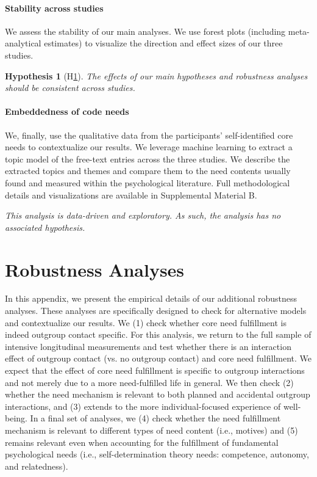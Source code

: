 \documentclass[man, 12pt, a4paper, mask]{apa7}
\theoremstyle{break}
\theoremstyle{plain}
\newtheorem{hyp}{Hypothesis}
\begin{document}
\paragraph{Stability across studies}
We assess the stability of our main analyses. We use forest plots (including meta-analytical estimates) to visualize the direction and effect sizes of our three studies.

\begin{mdframed}[style=mdfhypothesis]
    \begin{hyp}[H\ref{hyp:Stability}] \label{hyp:Stability}
    \addtolength{\leftskip}{1em}
    The effects of our main hypotheses and robustness analyses should be consistent across studies.
    \end{hyp}
\end{mdframed}

\paragraph{Embeddedness of code needs}
We, finally, use the qualitative data from the participants' self-identified core needs to contextualize our results. We leverage machine learning to extract a topic model of the free-text entries across the three studies. We describe the extracted topics and themes and compare them to the need contents usually found and measured within the psychological literature. Full methodological details and visualizations are available in Supplemental Material B.

\begin{mdframed}[style=mdfhypothesis]
    \addtolength{\leftskip}{1em}
    \textit{This analysis is data-driven and exploratory. As such, the analysis has no associated hypothesis.}
\end{mdframed}



\section{Robustness Analyses}
\label{app:AppendixRobustness}

In this appendix, we present the empirical details of our additional robustness analyses. These analyses are specifically designed to check for alternative models and contextualize our results. We (1) check whether core need fulfillment is indeed outgroup contact specific. For this analysis, we return to the full sample of intensive longitudinal measurements and test whether there is an interaction effect of outgroup contact (vs. no outgroup contact) and core need fulfillment. We expect that the effect of core need fulfillment is specific to outgroup interactions and not merely due to a more need-fulfilled life in general. We then check (2) whether the need mechanism is relevant to both planned and accidental outgroup interactions, and (3) extends to the more individual-focused experience of well-being. In a final set of analyses, we (4) check whether the need fulfillment mechanism is relevant to different types of need content (i.e., motives) and (5) remains relevant even when accounting for the fulfillment of fundamental psychological needs (i.e., self-determination theory needs: competence, autonomy, and relatedness).
\end{document}
